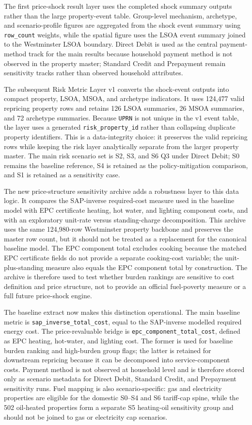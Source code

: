 The first price-shock result layer uses the completed shock summary outputs rather than the large property-event table. Group-level mechanism, archetype, and scenario-profile figures are aggregated from the shock event summary using \texttt{row\_count} weights, while the spatial figure uses the LSOA event summary joined to the Westminster LSOA boundary. Direct Debit is used as the central payment-method track for the main results because household payment method is not observed in the property master; Standard Credit and Prepayment remain sensitivity tracks rather than observed household attributes.

The subsequent Risk Metric Layer v1 converts the shock-event outputs into compact property, LSOA, MSOA, and archetype indicators. It uses 124,477 valid repricing property rows and retains 126 LSOA summaries, 26 MSOA summaries, and 72 archetype summaries. Because \texttt{UPRN} is not unique in the v1 event table, the layer uses a generated \texttt{risk\_property\_id} rather than collapsing duplicate property identifiers. This is a data-integrity choice: it preserves the valid repricing rows while keeping the risk layer analytically separate from the larger property master. The main risk scenario set is S2, S3, and S6 Q3 under Direct Debit; S0 remains the baseline reference, S4 is retained as the policy-mitigation comparison, and S1 is retained as a sensitivity case.

The new price-structure sensitivity archive adds a robustness layer to this data logic. It compares the SAP-inverse required-cost measure used in the baseline model with EPC certificate heating, hot water, and lighting component costs, and with an exploratory unit-rate versus standing-charge decomposition. This archive uses the same 124,980-row Westminster property backbone and preserves the master row count, but it should not be treated as a replacement for the canonical baseline model. The EPC component total excludes cooking because the matched EPC certificate fields do not provide a separate cooking-cost variable; the unit-plus-standing measure also equals the EPC component total by construction. The archive is therefore used to test whether burden rankings are sensitive to cost definition and price structure, not to provide an official fuel-poverty measure or a full future price-shock engine.

The baseline extract now makes this distinction operational. The main baseline metric is \texttt{sap\_inverse\_total\_cost}, equal to the SAP-inverse modelled required energy cost. The price-revaluable bridge is \texttt{epc\_component\_total\_cost}, defined as EPC heating, hot-water, and lighting cost. The former is used for baseline burden ranking and high-burden group flags; the latter is retained for downstream repricing because it can be decomposed into service-component costs. Payment method is not observed at household level and is therefore stored only as scenario metadata for Direct Debit, Standard Credit, and Prepayment sensitivity runs. Fuel mapping is also scenario-specific: gas and electricity properties are eligible for the domestic S0--S4 and S6 tariff-cap spine, while the 502 oil-heated properties form a separate S5 heating-oil sensitivity group and should not be joined to gas or electricity cap scenarios.

